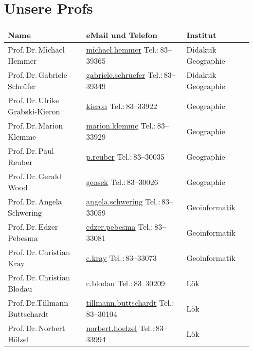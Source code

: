 \newpage

\section{Unsere Profs}
\begin{small}
\begin{longtable}{p{} p{} p{}}
  Name & eMail und Telefon & Institut\\ \hline \hline
  Prof.\,Dr.\,Michael Hemmer & \url{michael.hemmer} \newline Tel.:\,83--39365 & Didaktik Geographie\\
  Prof.\,Dr.\,Gabriele Schrüfer & \url{gabriele.schruefer} \newline Tel.:\,83--39349 & Didaktik Geographie\\  \hline
  Prof.\,Dr.\,Ulrike Grabski-Kieron & \url{kieron} \newline Tel.:\,83--33922 & Geographie\\
  Prof.\,Dr.\,Marion Klemme & \url{marion.klemme} \newline Tel.:\,83--33929 & Geographie\\
  Prof.\,Dr.\,Paul Reuber & \url{p.reuber} \newline Tel.:\,83--30035 & Geographie\\
  Prof.\,Dr.\,Gerald Wood & \url{geosek} \newline Tel.:\,83--30026 & Geographie\\ \hline
  Prof.\,Dr.\,Angela Schwering & \url{angela.schwering} \newline Tel.:\,83--33059 & Geoinformatik\\
  Prof.\,Dr.\,Edzer Pebesma & \url{edzer.pebesma} \newline Tel.:\,83--33081 & Geoinformatik\\ 
  Prof.\,Dr.\,Christian Kray & \url{c.kray} \newline Tel.:\,83--33073 &  Geoinformatik \\ \hline
  Prof.\,Dr.\,Christian Blodau & \url{c.blodau} \newline Tel.:\,83--30209& Lök \\ 
  Prof.\,Dr.\newline Tillmann Buttschardt & \url{tillmann.buttschardt} \newline Tel.:\,83--30104 & Lök\\
  Prof.\,Dr.\,Norbert Hölzel & \url{norbert.hoelzel} \newline Tel.:\,83--33994 & Lök\\

\end{longtable}
\end{small}
